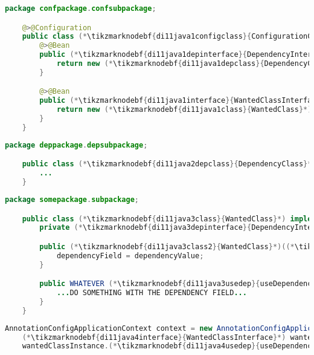 \enlargethispage{10mm}
\thispagestyle{empty}
\begin{lstlisting}[language=Java, title={Configuration class}]
    package confpackage.confsubpackage;

    @>@Configuration
    public class (*\tikzmarknodebf{di11java1configclass}{ConfigurationClass}*) {
        @>@Bean
        public (*\tikzmarknodebf{di11java1depinterface}{DependencyInterface}*) (*\tikzmarknodebf{di11java1depbeanid}{dependencyBeanMethod}*)() {
            return new (*\tikzmarknodebf{di11java1depclass}{DependencyClass}*)(...);
        }

        @>@Bean
        public (*\tikzmarknodebf{di11java1interface}{WantedClassInterface}*) (*\tikzmarknodebf{di11java1beanid}{wantedBeanMethod}*)() {
            return new (*\tikzmarknodebf{di11java1class}{WantedClass}*)((*\tikzmarknodebf{di11java1depbeanid2}{dependencyBeanMethod}*)());
        }
    }
\end{lstlisting}
\begin{lstlisting}[language=Java, title={Dependency class}]
    package deppackage.depsubpackage;

    public class (*\tikzmarknodebf{di11java2depclass}{DependencyClass}*) implements (*\tikzmarknodebf{di11java2depinterface}{DependencyInterface}*) {
        ...
    }
\end{lstlisting}
\begin{lstlisting}[language=Java, title={Wanted class with the constructor}]
    package somepackage.subpackage;

    public class (*\tikzmarknodebf{di11java3class}{WantedClass}*) implements (*\tikzmarknodebf{di11java3interface}{WantedClassInterface}*) {
        private (*\tikzmarknodebf{di11java3depinterface}{DependencyInterface}*) dependencyField;

        public (*\tikzmarknodebf{di11java3class2}{WantedClass}*)((*\tikzmarknodebf{di11java3depinterface2}{DependencyInterface}*) dependencyValue) {
            dependencyField = dependencyValue;
        }

        public WHATEVER (*\tikzmarknodebf{di11java3usedep}{useDependency}*)() {
            ...DO SOMETHING WITH THE DEPENDENCY FIELD...
        }
    }
\end{lstlisting}
\begin{lstlisting}[language=Java, title={Usage}]
    AnnotationConfigApplicationContext context = new AnnotationConfigApplicationContext((*\tikzmarknodebf{di11java4configclass}{ConfigurationClass}*).class);
    (*\tikzmarknodebf{di11java4interface}{WantedClassInterface}*) wantedClassInstance = context.getBean("(*\tikzmarknodebf{di11java4beanid}{wantedBeanMethod}[ForestGreen]*)", (*\tikzmarknodebf{di11java4interface2}{WantedClassInterface}*).class);
    wantedClassInstance.(*\tikzmarknodebf{di11java4usedep}{useDependency}*)();
\end{lstlisting}
